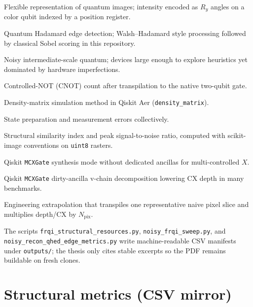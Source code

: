 \begin{description}[style=nextline, leftmargin=2.2cm, labelwidth=2cm, font=\normalfont\bfseries]
  \item[FRQI] Flexible representation of quantum images; intensity encoded as $R_y$ angles on a color qubit indexed by a position register.
  \item[QHED] Quantum Hadamard edge detection; Walsh--Hadamard style processing followed by classical Sobel scoring in this repository.
  \item[NISQ] Noisy intermediate-scale quantum; devices large enough to explore heuristics yet dominated by hardware imperfections.
  \item[CX] Controlled-NOT (CNOT) count after transpilation to the native two-qubit gate.
  \item[DM] Density-matrix simulation method in Qiskit Aer (\texttt{density\_matrix}).
  \item[SPAM] State preparation and measurement errors collectively.
  \item[SSIM / PSNR] Structural similarity index and peak signal-to-noise ratio, computed with scikit-image conventions on \texttt{uint8} rasters.
  \item[\texttt{noancilla}] Qiskit \texttt{MCXGate} synthesis mode without dedicated ancillas for multi-controlled $X$.
  \item[\texttt{v-chain}] Qiskit \texttt{MCXGate} dirty-ancilla v-chain decomposition lowering CX depth in many benchmarks.
  \item[\texttt{struct\_naive\_slice\_scaled}] Engineering extrapolation that transpiles one representative naive pixel slice and multiplies depth/CX by $N_{\mathrm{pix}}$.
\end{description}

The scripts \texttt{frqi\_structural\_resources.py}, \texttt{noisy\_frqi\_sweep.py}, and \texttt{noisy\_recon\_qhed\_edge\_metrics.py} write machine-readable CSV manifests under \texttt{outputs/}; the thesis only cites stable excerpts so the PDF remains buildable on fresh clones.

\chapter{Structural metrics (CSV mirror)}

